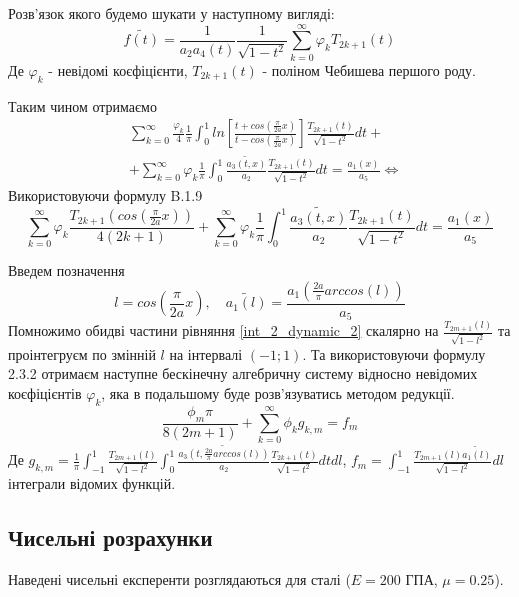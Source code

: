 Розв'язок якого будемо шукати у наступному вигляді:
\begin{equation}
    \widetilde{f(t)} = \frac{1}{a_2 a_4(t)} \frac{1}{\sqrt{1 - t^2}} \sum_{k=0}^{\infty} \varphi_k T_{2k + 1}(t) 
\end{equation}
Де $\varphi_k$ - невідомі коєфіцієнти, $T_{2k + 1}(t)$ - поліном Чебишева першого роду.

Таким чином отримаємо
\begin{align*}
    & \sum_{k=0}^{\infty}  \frac{\varphi_k}{4} \frac{1}{\pi} \int_{0}^{1} ln\left[ \frac{t + cos(\frac{\pi}{2a}x)}{t - cos(\frac{\pi}{2a}x)} \right] \frac{T_{2k + 1}(t)}{\sqrt{1 - t^2}} dt + \\
    & + \sum_{k=0}^{\infty} \varphi_k \frac{1}{\pi} \int_{0}^{1} \frac{\widetilde{a_3(t, x)}}{a_2} \frac{T_{2k + 1}(t)}{\sqrt{1 - t^2}} dt = \frac{a_1(x)}{a_5} \Leftrightarrow
\end{align*}
Використовуючи формулу B.1.9 \cite{ortogonal}
\begin{equation}\label{int_2_dynamic_2}
    \sum_{k=0}^{\infty}  \varphi_k \frac{T_{2k + 1}( cos(\frac{\pi}{2a}x) )}{4(2k + 1)} + \sum_{k=0}^{\infty} \varphi_k \frac{1}{\pi} \int_{0}^{1} \frac{\widetilde{a_3(t, x)}}{a_2} \frac{T_{2k + 1}(t)}{\sqrt{1 - t^2}} dt = \frac{a_1(x)}{a_5}
\end{equation}

Введем позначення
\begin{equation*}
    l = cos(\frac{\pi}{2a}x), \quad \widetilde{a_1(l)} = \frac{a_1(\frac{2a}{\pi} arccos(l))}{a_5}
\end{equation*}
Помножимо обидві частини рівняння \eqref{int_2_dynamic_2} скалярно на $\frac{T_{2m + 1}(l)}{\sqrt{1 - l^2}}$ та проінтегруєм по змінній $l$ на інтервалі $(-1; 1)$.
Та використовуючи формулу 2.3.2 \cite{ortogonal} отримаєм наступне бескінечну алгебричну систему відносно невідомих коєфіцієнтів $\varphi_k$, яка в подальшому буде розв'язуватись методом редукції.
\begin{equation}\label{int_system_dynamic_2}
    \frac{\phi_m \pi}{8(2m + 1)} + \sum_{k=0}^{\infty} \phi_k g_{k, m} = f_m
\end{equation}
Де $g_{k, m} = \frac{1}{\pi} \int_{-1}^{1} \frac{T_{2m + 1}(l)}{\sqrt{1 - l^2}} \int_{0}^{1} \frac{\widetilde{a_3(t, \frac{2a}{\pi} arccos(l) )}}{a_2} \frac{T_{2k + 1}(t)}{\sqrt{1 - t^2}} dt dl$,
$f_m = \int_{-1}^{1} \frac{T_{2m + 1}(l) \widetilde{a_1(l)}}{\sqrt{1 - l^2}} dl$ інтеграли відомих функцій.

\subsection{Чисельні розрахунки}
Наведені чисельні експеренти розглядаються для сталі ($E=200$ ГПА, $\mu=0.25$).

